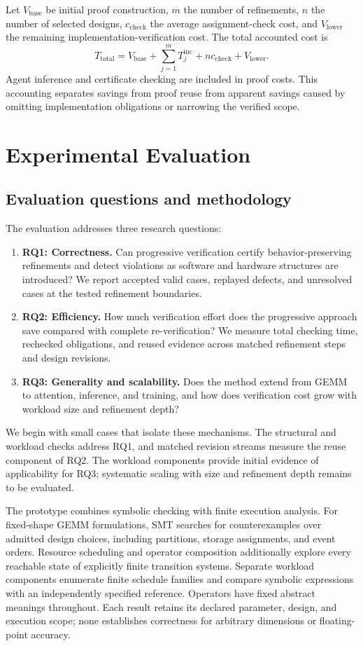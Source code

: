\documentclass[11pt]{article}
\begin{document}
Let $V_{\mathrm{base}}$ be initial proof construction, $m$ the number of refinements, $n$ the number of selected designs, $c_{\mathrm{check}}$ the average assignment-check cost, and $V_{\mathrm{lower}}$ the remaining implementation-verification cost. The total accounted cost is
\begin{equation}
 T_{\mathrm{total}}=V_{\mathrm{base}}+\sum_{j=1}^{m}T^{\mathrm{inc}}_j
 +nc_{\mathrm{check}}+V_{\mathrm{lower}}.
\end{equation}
Agent inference and certificate checking are included in proof costs. This accounting separates savings from proof reuse from apparent savings caused by omitting implementation obligations or narrowing the verified scope.

\section{Experimental Evaluation}\label{sec:evaluation}
\subsection{Evaluation questions and methodology}
The evaluation addresses three research questions:
\begin{enumerate}
\item \textbf{RQ1: Correctness.} Can progressive verification certify behavior-preserving refinements and detect violations as software and hardware structures are introduced? We report accepted valid cases, replayed defects, and unresolved cases at the tested refinement boundaries.
\item \textbf{RQ2: Efficiency.} How much verification effort does the progressive approach save compared with complete re-verification? We measure total checking time, rechecked obligations, and reused evidence across matched refinement steps and design revisions.
\item \textbf{RQ3: Generality and scalability.} Does the method extend from GEMM to attention, inference, and training, and how does verification cost grow with workload size and refinement depth?
\end{enumerate}
We begin with small cases that isolate these mechanisms. The structural and workload checks address RQ1, and matched revision streams measure the reuse component of RQ2. The workload components provide initial evidence of applicability for RQ3; systematic scaling with size and refinement depth remains to be evaluated.

The prototype combines symbolic checking with finite execution analysis. For fixed-shape GEMM formulations, SMT searches for counterexamples over admitted design choices, including partitions, storage assignments, and event orders. Resource scheduling and operator composition additionally explore every reachable state of explicitly finite transition systems. Separate workload components enumerate finite schedule families and compare symbolic expressions with an independently specified reference. Operators have fixed abstract meanings throughout. Each result retains its declared parameter, design, and execution scope; none establishes correctness for arbitrary dimensions or floating-point accuracy.
\end{document}

